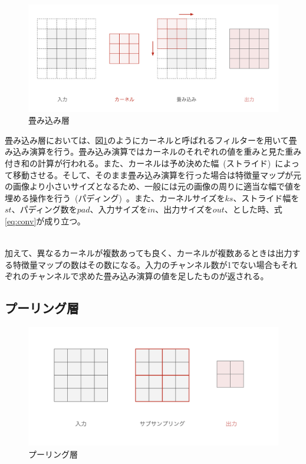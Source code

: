 \begin{figure}[b]
\begin{center}
\includegraphics[width=\hsize]{figure/convolution.png}
\caption{畳み込み層}
\label{fig:conv}
\end{center}
\end{figure}
    

畳み込み層においては、図\ref{fig:conv}のようにカーネルと呼ばれるフィルターを用いて畳み込み演算を行う。畳み込み演算ではカーネルのそれぞれの値を重みと見た重み付き和の計算が行われる。また、カーネルは予め決めた幅~(ストライド)~によって移動させる。そして、そのまま畳み込み演算を行った場合は特徴量マップが元の画像より小さいサイズとなるため、一般には元の画像の周りに適当な幅で値を埋める操作を行う~(パディング)~。また、カーネルサイズを$ks$、ストライド幅を$st$、パディング数を$pad$、入力サイズを$in$、出力サイズを$out$、とした時、式\ref{eq:conv}が成り立つ。

\begin{align}
    \label{eq:conv}
\end{align}

加えて、異なるカーネルが複数あっても良く、カーネルが複数あるときは出力する特徴量マップの数はその数になる。入力のチャンネル数が1でない場合もそれぞれのチャンネルで求めた畳み込み演算の値を足したものが返される。

\subsection{プーリング層}

\begin{figure}[b]
\begin{center}
\includegraphics[width=\hsize]{figure/pooling.png}
\caption{プーリング層}
\label{fig:pooling}
\end{center}
\end{figure}

